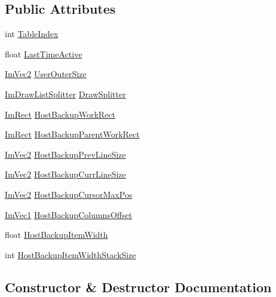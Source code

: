 \subsection*{Public Attributes}
\begin{DoxyCompactItemize}
\item 
int \hyperlink{structImGuiTableTempData_af849fb1f0115dd53be49419b355487a3}{Table\+Index}
\item 
float \hyperlink{structImGuiTableTempData_a01ecfb0853f61b80562f4efb4d818e00}{Last\+Time\+Active}
\item 
\hyperlink{structImVec2}{Im\+Vec2} \hyperlink{structImGuiTableTempData_aaf4e14bfbf965747f8925825dcb13255}{User\+Outer\+Size}
\item 
\hyperlink{structImDrawListSplitter}{Im\+Draw\+List\+Splitter} \hyperlink{structImGuiTableTempData_a58750d8c40edf42a42388c8de5561d78}{Draw\+Splitter}
\item 
\hyperlink{structImRect}{Im\+Rect} \hyperlink{structImGuiTableTempData_a092004ee9129a9bebbdf2fdc526e719a}{Host\+Backup\+Work\+Rect}
\item 
\hyperlink{structImRect}{Im\+Rect} \hyperlink{structImGuiTableTempData_affc535ee4832dd01bb333429a92468f9}{Host\+Backup\+Parent\+Work\+Rect}
\item 
\hyperlink{structImVec2}{Im\+Vec2} \hyperlink{structImGuiTableTempData_a1b6008b01aeb6e9a6f0fd8f33bfc7321}{Host\+Backup\+Prev\+Line\+Size}
\item 
\hyperlink{structImVec2}{Im\+Vec2} \hyperlink{structImGuiTableTempData_ab0cac17962feb208574b865a0c0b58df}{Host\+Backup\+Curr\+Line\+Size}
\item 
\hyperlink{structImVec2}{Im\+Vec2} \hyperlink{structImGuiTableTempData_a1003b9b8560821ddc837a53138e9ba48}{Host\+Backup\+Cursor\+Max\+Pos}
\item 
\hyperlink{structImVec1}{Im\+Vec1} \hyperlink{structImGuiTableTempData_a5ac89d67a916adeb1347eee3fd45fd3e}{Host\+Backup\+Columns\+Offset}
\item 
float \hyperlink{structImGuiTableTempData_af350c800daf323ab8aa2e3bbb7ae6390}{Host\+Backup\+Item\+Width}
\item 
int \hyperlink{structImGuiTableTempData_ab17dc8ab0c84bc050265601ff01f0dff}{Host\+Backup\+Item\+Width\+Stack\+Size}
\end{DoxyCompactItemize}


\subsection{Constructor \& Destructor Documentation}
\mbox{\label{structImGuiTableTempData_a89c6bdafaf73ccae9e3dc25b96dc7dab}} 
